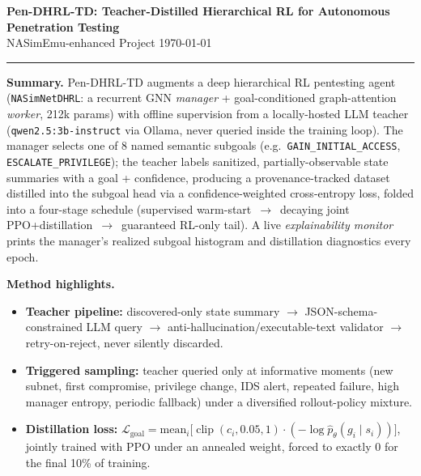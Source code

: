\documentclass[10pt]{article}
\newcommand{\code}[1]{\texttt{\small #1}}
\begin{document}
{\Large\bfseries Pen-DHRL-TD: Teacher-Distilled Hierarchical RL for Autonomous Penetration Testing}\\[2pt]
{\small NASimEmu-enhanced Project \hfill \today}

\vspace{2pt}
\hrule
\vspace{6pt}

\textbf{Summary.} Pen-DHRL-TD augments a deep hierarchical RL pentesting agent
(\code{NASimNetDHRL}: a recurrent GNN \emph{manager} + goal-conditioned graph-attention
\emph{worker}, 212k params) with offline supervision from a locally-hosted LLM teacher
(\code{qwen2.5:3b-instruct} via Ollama, never queried inside the training loop). The
manager selects one of 8 named semantic subgoals (e.g.\ \code{GAIN\_INITIAL\_ACCESS},
\code{ESCALATE\_PRIVILEGE}); the teacher labels sanitized, partially-observable state
summaries with a goal + confidence, producing a provenance-tracked dataset distilled
into the subgoal head via a confidence-weighted cross-entropy loss, folded into a
four-stage schedule (supervised warm-start~$\to$~decaying joint PPO+distillation~$\to$~guaranteed
RL-only tail). A live \emph{explainability monitor} prints the manager's realized
subgoal histogram and distillation diagnostics every epoch.

\textbf{Method highlights.}
\begin{itemize}[nosep,leftmargin=1.2em]
  \item \textbf{Teacher pipeline:} discovered-only state summary $\to$ JSON-schema-constrained
    LLM query $\to$ anti-hallucination/executable-text validator $\to$ retry-on-reject,
    never silently discarded.
  \item \textbf{Triggered sampling:} teacher queried only at informative moments
    (new subnet, first compromise, privilege change, IDS alert, repeated failure, high
    manager entropy, periodic fallback) under a diversified rollout-policy mixture.
  \item \textbf{Distillation loss:} $\mathcal{L}_{\text{goal}} = \text{mean}_i\big[
    \operatorname{clip}(c_i, 0.05, 1)\cdot(-\log \hat p_\theta(g_i\mid s_i))\big]$,
    jointly trained with PPO under an annealed weight, forced to exactly 0 for the
    final 10\% of training.
\end{itemize}
\end{document}
